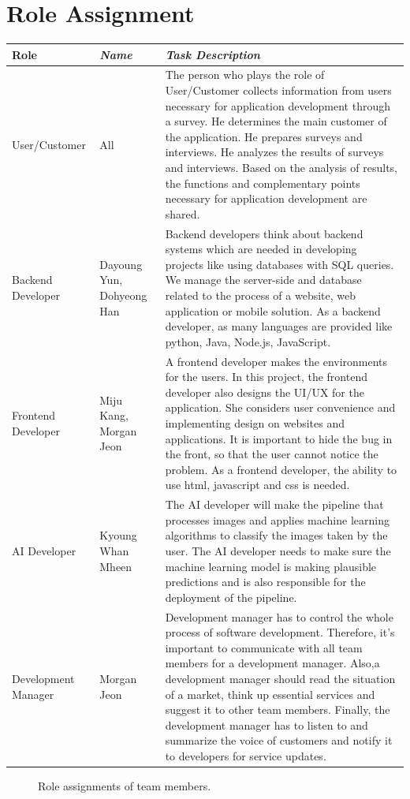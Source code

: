 \documentclass[conference]{IEEEtran}
\begin{document}
\section*{Role Assignment}
\begin{table}
\begin{center}
\begin{tabular}{|p{}|p{}|p{}|}
\cline{1-3} 
\textbf{Role} & \textbf{\textit{Name}}& \textbf{\textit{Task Description}}\\
\hline
User/Customer&All&The person who plays the role of User/Customer collects information from users necessary for application development through a survey. He determines the main customer of the application. He prepares surveys and interviews. He analyzes the results of surveys and interviews. Based on the analysis of results, the functions and complementary points necessary for application development are shared. \\
\hline
Backend Developer&Dayoung Yun, Dohyeong Han&Backend developers think about backend systems which are needed in developing projects like using databases with SQL queries. We manage the server-side and database related to the process of a website, web application or mobile solution. As a backend developer, as many languages are provided like python, Java, Node.js, JavaScript.\\
\hline
Frontend Developer&Miju Kang,
Morgan Jeon&A frontend developer makes the environments for the users. In this project, the frontend developer also designs the UI/UX for the application. She considers user convenience and implementing design on websites and applications. It is important to hide the bug in the front, so that the user cannot notice the problem. As a frontend developer, the ability to use html, javascript and css is needed.\\
\hline
AI Developer&Kyoung Whan Mheen&The AI developer will make the pipeline that processes images and applies machine learning algorithms to classify the images taken by the user. The AI developer needs to make sure the machine learning model is making plausible predictions and is also responsible for the deployment of the pipeline.\\
\hline
Development Manager&Morgan Jeon&Development manager has to control the whole process of  software development. Therefore, it’s important to communicate with all team members for a development manager. Also,a development manager should read the situation of a market, think up essential services and suggest it to other team members. Finally, the development manager has to listen to and summarize the voice of customers and notify it to developers for service updates.\\
\hline

\end{tabular}
\label{tab1}
\end{center}
\end{table}

\begin{figure}[h!]
\caption{Role assignments of team members.}
\label{fig}
\end{figure}
\end{document}
